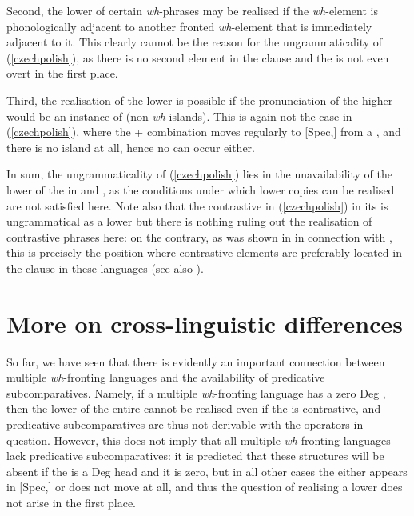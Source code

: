 Second, the lower  of certain \textit{wh}-phrases may be realised if the \textit{wh}-element is phonologically adjacent to another fronted \textit{wh}-element that is immediately adjacent to it. This clearly cannot be the reason for the ungrammaticality of (\ref{czechpolish}), as there is no second  element in the clause and the  is not even overt in the first place.

Third, the realisation of the lower  is possible if the pronunciation of the higher  would be an instance of  (non-\textit{wh}-islands). This is again not the case in (\ref{czechpolish}), where the  +  combination moves regularly to [Spec,] from a , and there is no island at all, hence no  can occur either.

\largerpage[1]
In sum, the ungrammaticality of (\ref{czechpolish}) lies in the unavailability of the lower  of the  in  and , as the conditions under which lower copies can be realised are not satisfied here. Note also that the contrastive  in (\ref{czechpolish}) in its  is ungrammatical as a lower  but there is nothing ruling out the realisation of contrastive phrases here: on the contrary, as was shown in  in connection with , this is precisely the position where contrastive elements are preferably located in the clause in these languages (see also \citealt{simikwierzba2012}). 

\section{More on cross-linguistic differences} \label{sec:5moreon}
So far, we have seen that there is evidently an important connection between multiple \textit{wh}-fronting languages and the availability of predicative subcomparatives. Namely, if a multiple \textit{wh}-fronting language has a zero Deg , then the lower  of the entire  cannot be realised even if the  is contrastive, and predicative subcomparatives are thus not derivable with the operators in question. However, this does not imply that all multiple \textit{wh}-fronting languages lack predicative subcomparatives: it is predicted that these structures will be absent if the  is a Deg head and it is zero, but in all other cases the  either appears in [Spec,] or does not move at all, and thus the question of realising a lower  does not arise in the first place.

